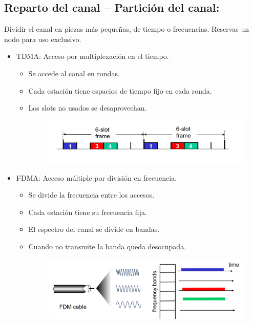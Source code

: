 \documentclass[12pt, twoside, openright]{report} %
\begin{document}
   \subsection{Reparto del canal -- Partición del canal:}
   Dividir el canal en
      piezas más pequeñas, de tiempo o frecuencias. Reservas un nodo
      para uso exclusivo.
\pagebreak
      \begin{itemize}
      \item
        TDMA: Acceso por multiplexación en el tiempo.

        \begin{itemize}
        \item
          Se accede al canal en rondas.
        \item
          Cada estación tiene espacios de tiempo fijo en cada ronda.
        \item
          Los slots no usados se desaprovechan.
          \begin{figure}[H]
            {\includegraphics[scale=.25]{Untitled 48.png}}
          \end{figure}
        \end{itemize}
      \item
        FDMA: Acceso múltiple por división en frecuencia.

        \begin{itemize}
        \item
          Se divide la frecuencia entre los accesos.
        \item
          Cada estación tiene su frecuencia fija.
        \item
          El espectro del canal se divide en bandas.
        \item
          Cuando no transmite la banda queda desocupada.
          \begin{figure}[H]
            {\includegraphics[scale=.2]{Untitled 49.png}}
          \end{figure}
        \end{itemize}
      \end{itemize}
\end{document}
